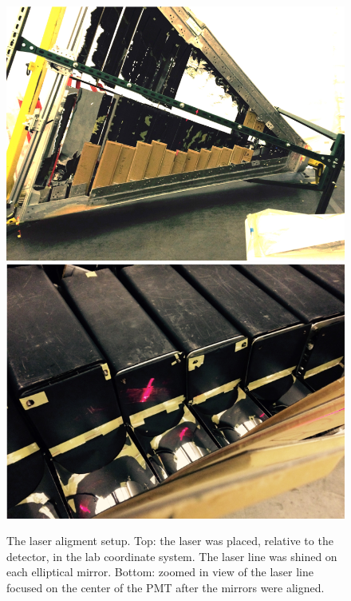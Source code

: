 \begin{figure}[h]
\centering
	\includegraphics[width=0.95\columnwidth, keepaspectratio]{img/laserAlignment1.png}
	\includegraphics[width=0.95\columnwidth, keepaspectratio]{img/laserAlignment2.png}
\caption{The laser aligment setup. Top: the laser was placed, relative to the detector, in the lab coordinate system. The laser line was shined on each elliptical mirror.
         Bottom: zoomed in view of the laser line focused on the center of the PMT after the mirrors were aligned.}
	\label{fig:laserAlignment}
\end{figure}

